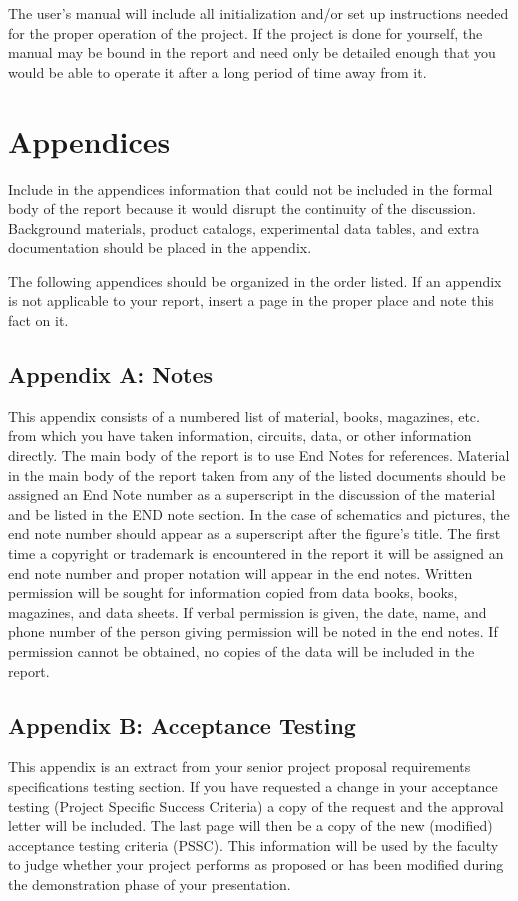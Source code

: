 \documentclass[12pt]{article}
\begin{document}
The user's manual will include all initialization and/or set up instructions needed for the proper operation of the project. If the project is done for yourself, the manual may be bound in the report and need only be detailed enough that you would be able to operate it after a long period of time away from it.

\section{Appendices}
Include in the appendices information that could not be included in the formal body of the report because it would disrupt the continuity of the discussion. Background materials, product catalogs, experimental data tables, and extra documentation should be placed in the appendix.

The following appendices should be organized in the order listed. If an appendix is not applicable to your report, insert a page in the proper place and note this fact on it.

\subsection*{Appendix A: Notes}
This appendix consists of a numbered list of material, books, magazines, etc. from which you have taken information, circuits, data, or other information directly. The main body of the report is to use End Notes for references. Material in the main body of the report taken from any of the listed documents should be assigned an End Note number as a superscript in the discussion of the material and be listed in the END note section. In the case of schematics and pictures, the end note number should appear as a superscript after the figure's title. The first time a copyright or trademark is encountered in the report it
will be assigned an end note number and proper notation will appear in the end notes. Written permission will be sought for information copied from data books, books, magazines, and data sheets. If verbal permission is given, the date, name, and phone number of the person giving permission will be noted in the end notes. If permission cannot be obtained, no copies of the data will be included in the report.

\subsection*{Appendix B: Acceptance Testing}
This appendix is an extract from your senior project proposal requirements specifications testing section. If you have requested a change in your acceptance testing (Project Specific Success Criteria) a copy of the request and the approval letter will be included. The last page will then be a copy of the new (modified) acceptance testing criteria (PSSC). This information will be used by the faculty to judge whether your project performs as proposed or has been modified during the demonstration phase of your presentation.
\end{document}

